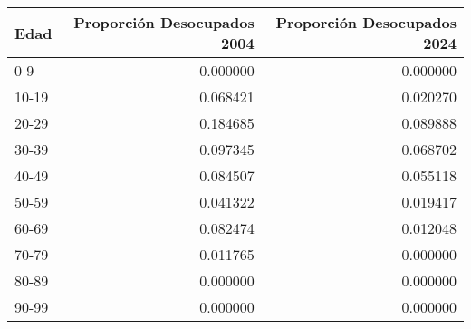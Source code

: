 \begin{tabular}{lrr}
\toprule
Edad & Proporción Desocupados 2004 & Proporción Desocupados 2024 \\
\midrule
0-9 & 0.000000 & 0.000000 \\
10-19 & 0.068421 & 0.020270 \\
20-29 & 0.184685 & 0.089888 \\
30-39 & 0.097345 & 0.068702 \\
40-49 & 0.084507 & 0.055118 \\
50-59 & 0.041322 & 0.019417 \\
60-69 & 0.082474 & 0.012048 \\
70-79 & 0.011765 & 0.000000 \\
80-89 & 0.000000 & 0.000000 \\
90-99 & 0.000000 & 0.000000 \\
\bottomrule
\end{tabular}
